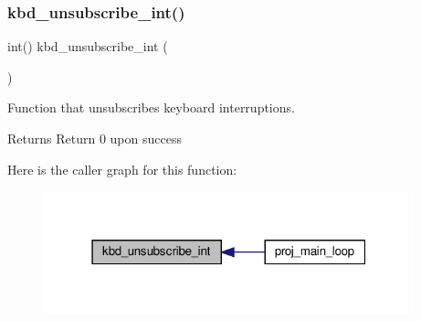 \subsubsection{\texorpdfstring{kbd\+\_\+unsubscribe\+\_\+int()}{kbd\_unsubscribe\_int()}}
{\footnotesize\ttfamily int() kbd\+\_\+unsubscribe\+\_\+int (\begin{DoxyParamCaption}{ }\end{DoxyParamCaption})}



Function that unsubscribes keyboard interruptions. 

\begin{DoxyReturn}{Returns}
Return 0 upon success 
\end{DoxyReturn}
Here is the caller graph for this function\+:
\nopagebreak
\begin{figure}[H]
\begin{center}
\leavevmode
\includegraphics[width=304pt]{group__keyboard_gaee0a7b54ee426fade9c780418d110fe0_icgraph}
\end{center}
\end{figure}
